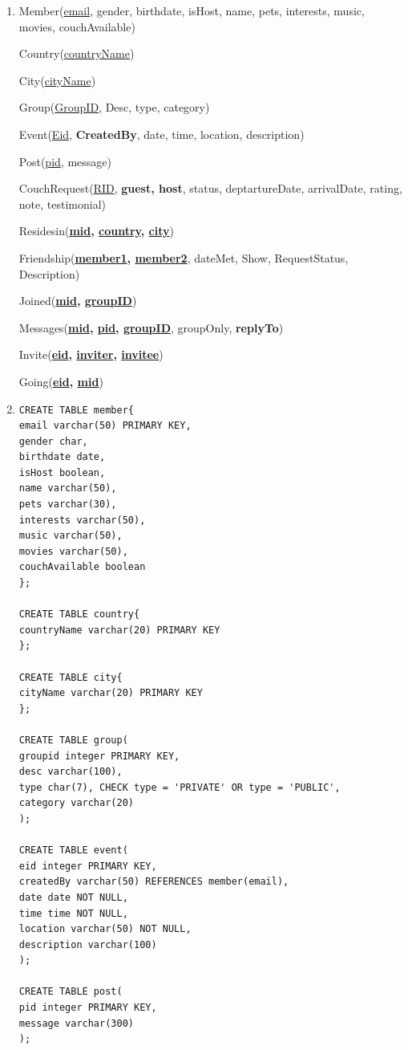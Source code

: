 \documentclass[10pt,a4paper]{article}
\begin{document}
\begin{enumerate}
\item Member(\underline{email}, gender, birthdate, isHost, name, pets, interests, music, movies, couchAvailable)

Country(\underline{countryName})

City(\underline{cityName})

Group(\underline{GroupID}, Desc, type, category)

Event(\underline{Eid}, \textbf{CreatedBy}, date, time, location, description)

Post(\underline{pid}, message)

CouchRequest(\underline{RID},\textbf{ guest, host}, status, deptartureDate, arrivalDate, rating, note, testimonial)

Residesin(\textbf{\underline{mid}, \underline{country}, \underline{city}})

Friendship(\textbf{\underline{member1}, \underline{member2}}, dateMet, Show, RequestStatus, Description)

Joined(\textbf{\underline{mid}, \underline{groupID}})

Messages(\textbf{\underline{mid}, \underline{pid}, \underline{groupID}}, groupOnly, \textbf{replyTo})

Invite(\textbf{\underline{eid}, \underline{inviter}, \underline{invitee}})

Going(\textbf{\underline{eid}, \underline{mid}})

\item

\begin{verbatim}
CREATE TABLE member{
email varchar(50) PRIMARY KEY,
gender char,
birthdate date,
isHost boolean,
name varchar(50),
pets varchar(30),
interests varchar(50),
music varchar(50),
movies varchar(50), 
couchAvailable boolean
};

CREATE TABLE country{
countryName varchar(20) PRIMARY KEY
};

CREATE TABLE city{
cityName varchar(20) PRIMARY KEY
};

CREATE TABLE group(
groupid integer PRIMARY KEY,
desc varchar(100),
type char(7), CHECK type = 'PRIVATE' OR type = 'PUBLIC',
category varchar(20)
);

CREATE TABLE event(
eid integer PRIMARY KEY,
createdBy varchar(50) REFERENCES member(email),
date date NOT NULL,
time time NOT NULL,
location varchar(50) NOT NULL,
description varchar(100)
);

CREATE TABLE post(
pid integer PRIMARY KEY,
message varchar(300)
);


\end{verbatim}
\end{enumerate}
\end{document}
